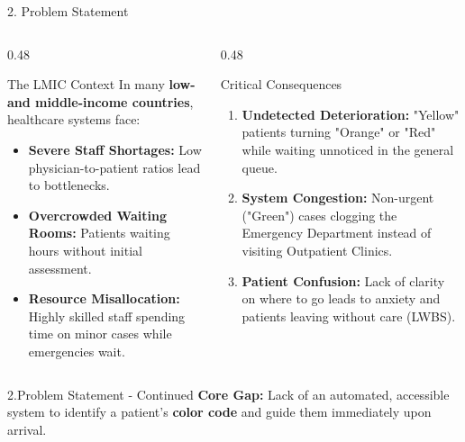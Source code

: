 \documentclass[aspectratio=169]{beamer}
\begin{document}
	\begin{frame}{2. Problem Statement}
		\begin{columns}[t]
			\begin{column}{0.48\textwidth}
				\begin{block}{The LMIC Context}
					In many \textbf{low- and middle-income countries}, healthcare systems face:
					\begin{itemize}
						\item \textbf{Severe Staff Shortages:} Low physician-to-patient ratios lead to bottlenecks.
						\item \textbf{Overcrowded Waiting Rooms:} Patients waiting hours without initial assessment.
						\item \textbf{Resource Misallocation:} Highly skilled staff spending time on minor cases while emergencies wait.
					\end{itemize}
				\end{block}
			\end{column}
			
			\begin{column}{0.48\textwidth}
				\begin{alertblock}{Critical Consequences}
					\begin{enumerate}
						\item \textbf{Undetected Deterioration:} "Yellow" patients turning "Orange" or "Red" while waiting unnoticed in the general queue.
						\item \textbf{System Congestion:} Non-urgent ("Green") cases clogging the Emergency Department instead of visiting Outpatient Clinics.
						\item \textbf{Patient Confusion:} Lack of clarity on where to go leads to anxiety and patients leaving without care (LWBS).
					\end{enumerate}
				\end{alertblock}
			\end{column}
		\end{columns}
		
		
	
	\end{frame}
	
	\begin{frame}{2.Problem Statement - Continued}
			\vspace{0.2cm}
		\textbf{Core Gap:} Lack of an automated, accessible system to identify a patient's \textbf{color code} and guide them immediately upon arrival.
	\end{frame}
	
\end{document}

